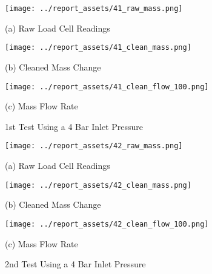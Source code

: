 \begin{figure}[htbp]
    \centering

    \begin{minipage}{0.32\textwidth}
        \centering
        \texttt{[image: ../report\_assets/41\_raw\_mass.png]}
        \caption*{(a) Raw Load Cell Readings}
    \end{minipage}
    \hfill
    \begin{minipage}{0.32\textwidth}
        \centering
        \texttt{[image: ../report\_assets/41\_clean\_mass.png]}
        \caption*{(b) Cleaned Mass Change}
    \end{minipage}
    \hfill
    \begin{minipage}{0.32\textwidth}
        \centering
        \texttt{[image: ../report\_assets/41\_clean\_flow\_100.png]}
        \caption*{(c) Mass Flow Rate}
    \end{minipage}
    \caption{1st Test Using a 4 Bar Inlet Pressure}

\end{figure}\label{fig:41}
\vfill
\begin{figure}[htbp]
    \centering

    \begin{minipage}{0.32\textwidth}
        \centering
        \texttt{[image: ../report\_assets/42\_raw\_mass.png]}
        \caption*{(a) Raw Load Cell Readings}
    \end{minipage}
    \hfill
    \begin{minipage}{0.32\textwidth}
        \centering
        \texttt{[image: ../report\_assets/42\_clean\_mass.png]}
        \caption*{(b) Cleaned Mass Change}
    \end{minipage}
    \hfill
    \begin{minipage}{0.32\textwidth}
        \centering
        \texttt{[image: ../report\_assets/42\_clean\_flow\_100.png]}
        \caption*{(c) Mass Flow Rate}
    \end{minipage}
    \caption{2nd Test Using a 4 Bar Inlet Pressure}
    
\end{figure}\label{fig:42}
\vfill
